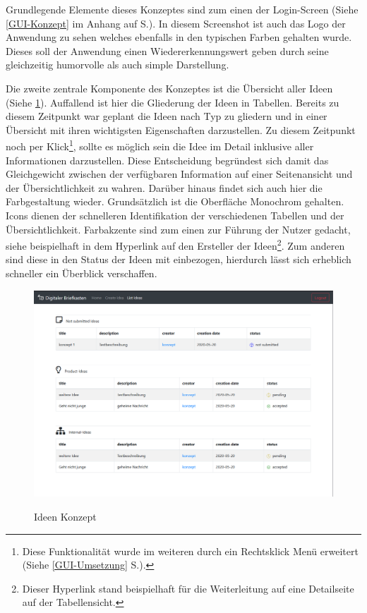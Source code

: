 Grundlegende Elemente dieses Konzeptes sind zum einen der Login-Screen (Siehe \ref{GUI-Konzept} im Anhang auf S.\pageref{GUI-Konzept}).
In diesem Screenshot ist auch das Logo der Anwendung zu sehen welches ebenfalls in den typischen Farben gehalten wurde. Dieses soll der Anwendung einen Wiedererkennungswert geben durch seine gleichzeitig humorvolle als auch simple Darstellung.

Die zweite zentrale Komponente des Konzeptes ist die Übersicht aller Ideen (Siehe \cref{fig:ideen}).
Auffallend ist hier die Gliederung der Ideen in Tabellen. Bereits zu diesem Zeitpunkt war geplant die Ideen nach Typ zu gliedern und in einer Übersicht mit ihren wichtigsten Eigenschaften darzustellen.
Zu diesem Zeitpunkt noch per Klick\footnote{Diese Funktionalität wurde im weiteren durch ein Rechtsklick Menü erweitert (Siehe \ref{GUI-Umsetzung} S.\pageref{GUI-Umsetzung}).}, sollte es möglich sein die Idee im Detail inklusive aller Informationen darzustellen. Diese Entscheidung begründest sich damit das Gleichgewicht zwischen der verfügbaren Information auf einer Seitenansicht und der Übersichtlichkeit zu wahren.
Darüber hinaus findet sich auch hier die Farbgestaltung wieder. Grundsätzlich ist die Oberfläche Monochrom gehalten. Icons dienen der schnelleren Identifikation der verschiedenen Tabellen und der Übersichtlichkeit. Farbakzente sind zum einen zur Führung der Nutzer gedacht, siehe beispielhaft in dem Hyperlink auf den Ersteller der Ideen\footnote{Dieser Hyperlink stand beispielhaft für die Weiterleitung auf eine Detailseite auf der Tabellensicht.}. Zum anderen sind diese in den Status der Ideen mit einbezogen, hierdurch lässt sich erheblich schneller ein Überblick verschaffen.

\begin{figure}[hbt]
    \centering
    \begin{minipage}[t]{1\textwidth}
        \caption{Ideen Konzept}
        \includegraphics[width=1\textwidth]{img/ideen-Konzept.png}\\
        \label{fig:ideen}
    \end{minipage}
\end{figure}


